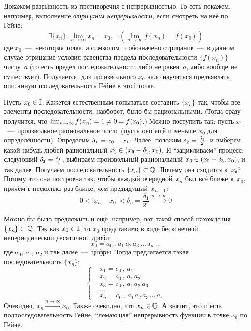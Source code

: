 \documentclass[a4paper,12pt]{article}
\begin{document}
  \begin{solution}
    Докажем разрывность из противоречия с непрерывностью.
    То есть покажем, например, выполнение \emph{отрицания непрерывности}, если смотреть на неё по Гейне:
    \begin{equation}\label{eq:22-giyne-seq}
      \exists \{x_n\}\colon \lim_{n \to \infty} x_n = x_0,\ \neg{\left(\lim_{n \to \infty} f(x_n) = f(x_0)\right)}
    \end{equation}
    где $x_0$~---~некоторая точка, а символом $\neg$ обозначено отрицание~---~в данном случае отрицание условия равенства предела последовательности $\{f(x_n)\}$ числу~$a$ (то есть предел последовательности либо не равен~$a$, либо вообще не существует).
    Получается, для произвольного $x_0$ надо научиться предъявлять описанную последовательность Гейне в этой точке.

    Пусть $x_0 \hm\in \II$.
    Кажется естественным попытаться составить $\{x_n\}$ так, чтобы все элементы последовательности, наоборот, было бы рациональными.
    (Тогда сразу получится, что $\lim_{n \to \infty} f(x_n) \hm= 1 \hm{\not=} 0 \hm= f(x_0)$.)
    Можно поступить так: пусть $x_1$~---~произвольное рациональное число (пусть оно ещё и меньше $x_0$ для определённости).
    Определим $\delta_1 \hm= x_0 \hm- x_1$.
    Далее, положим $\delta_2 \hm= \frac{\delta_1}{2}$, и выберем какой-нибудь любой рациональный $x_2 \hm\in (x_0 \hm- \delta_2, x_0)$.
    И ``зацикливаем'' процесс: следующий $\delta_3 \hm= \frac{\delta_2}{2}$, выбираем произвольный рациональный $x_3 \hm\in (x_0 \hm- \delta_3, x_0)$, и так далее.
    Получаем последовательность $\{x_n\} \hm\subset \QQ$.
    Почему она сходится к~$x_0$?
    Потому что она построена так, чтобы каждый очередной~$x_n$ был всё ближе к~$x_0$, причём в несколько раз ближе, чем предыдущий~$x_{n - 1}$:
    \[
      0 < |x_n - x_0| < \delta_n = \frac{\delta_1}{2^n} \xrightarrow{n \to \infty} 0
    \]

    Можно бы было предложить и ещё, например, вот такой способ нахождения $\{x_n\} \hm\subset \QQ$.
    Так как $x_0 \hm\in \II$, то $x_0$ представимо в виде бесконечной непериодической десятичной дроби:
    \[
      x_0 = a_0\,{,}\,a_1\,a_2\,a_3\,\ldots\,a_n\,\ldots
    \]
    где $a_0$, $a_1$, $a_2$ и так далее~---~цифры.
    Тогда предлагается такая последовательность $\{x_n\}$:
    \[
      \left\{\begin{aligned}
        &x_1 = a_0\,{,}\,a_1\\
        &x_2 = a_0\,{,}\,a_1\,a_2\\
        &x_3 = a_0\,{,}\,a_1\,a_2\,a_3\\
        &\ldots\\
        &x_n = a_0\,{,}\,a_1\,a_2\,a_3\,\ldots\,a_n
      \end{aligned}\right.
    \]
    Очевидно, $x_n \xrightarrow{n \to \infty} x_0$.
    Также очевидно, что $x_n \hm\in \QQ$.
    А значит, это и есть подпоследовательность Гейне, ``ломающая'' непрерывность функции в точке $x_0$ по Гейне.


\end{solution}
\end{document}
